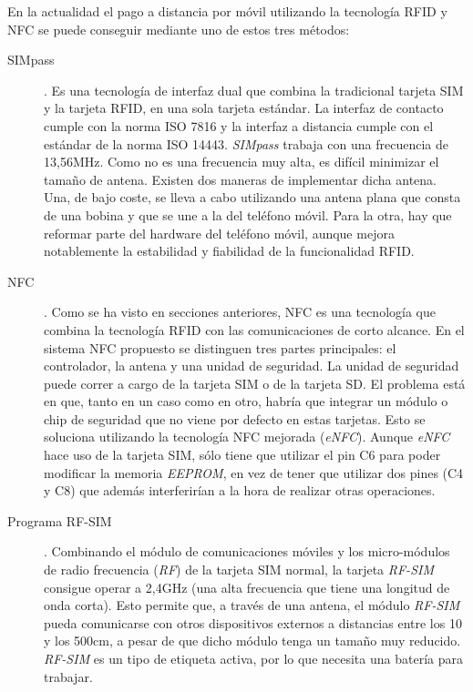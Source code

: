   En la actualidad el pago a distancia por móvil utilizando la tecnología
  \acs{RFID} y \acs{NFC} se puede conseguir mediante uno de estos tres métodos:
  \begin{description}
  \item[SIMpass]. Es una tecnología de interfaz dual que combina la
  tradicional tarjeta \acs{SIM} y la tarjeta \acs{RFID}, en una sola tarjeta
  estándar. La interfaz de contacto cumple con la norma \acs{ISO} 7816 y la
  interfaz a distancia cumple con el estándar de la norma \acs{ISO} 14443.
  \emph{SIMpass} trabaja con una frecuencia de 13,56MHz. Como no es una
  frecuencia muy alta, es difícil minimizar el tamaño de antena. Existen dos
  maneras de implementar dicha antena. Una, de bajo coste, se lleva a cabo 
  utilizando una antena plana que consta de una bobina y que se une a la 
  del teléfono móvil. Para la otra, hay que reformar parte del hardware del 
  teléfono móvil, aunque mejora notablemente la estabilidad y fiabilidad de la
  funcionalidad \acs{RFID}.

  \item[NFC]. Como se ha visto en secciones anteriores, \acs{NFC} es una
  tecnología que combina la tecnología \acs{RFID} con las comunicaciones de
  corto alcance. En el sistema \acs{NFC} propuesto se distinguen tres partes 
  principales: el controlador, la antena y una unidad de seguridad. La unidad
  de seguridad puede correr a cargo de la tarjeta \acs{SIM} o de la tarjeta
  \acs{SD}. El problema está en que, tanto en un caso como en otro, habría que 
  integrar un módulo o chip de seguridad que no viene por defecto en estas 
  tarjetas. Esto se soluciona utilizando la tecnología \acs{NFC} mejorada 
  (\emph{eNFC}). Aunque \emph{eNFC} hace uso de la tarjeta \acs{SIM}, sólo 
  tiene que utilizar el pin C6 para poder modificar la memoria \emph{EEPROM}, 
  en vez de tener que utilizar dos pines (C4 y C8) que además interferirían a 
  la hora de realizar otras operaciones.

    \item[Programa RF-SIM]. Combinando el módulo de comunicaciones móviles y
  los micro-módulos de radio frecuencia (\emph{RF}) de la tarjeta \acs{SIM}
  normal, la tarjeta \emph{RF-SIM} consigue operar a 2,4GHz (una alta 
  frecuencia que tiene una longitud de onda corta). Esto permite que, a través
  de una antena, el módulo \emph{RF-SIM} pueda comunicarse con otros 
  dispositivos externos a distancias entre los 10 y los 500cm, a pesar de que
  dicho módulo tenga un tamaño muy reducido. \emph{RF-SIM} es un tipo de
  etiqueta activa, por lo que necesita una batería para trabajar.
  \end{description}

